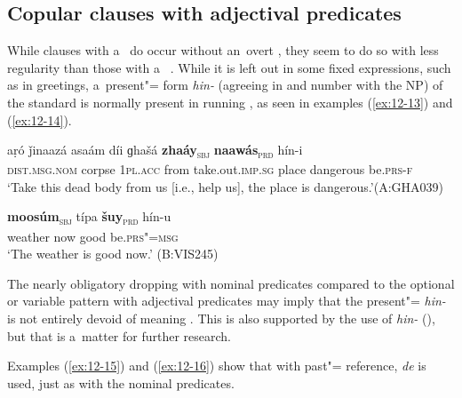 \subsection{Copular clauses with adjectival predicates}
\label{subsec:12-1-2}


While clauses with a~   do occur without an~overt , they seem to do so with less regularity than those with a~  . While it is left out in some fixed expressions, such as in greetings, a~present"= form \textit{hin-} (agreeing in  and number with the NP) of the standard  is normally present in running , as seen in examples (\ref{ex:12-13}) and (\ref{ex:12-14}). 

\ea
\label{ex:12-13}
\gll aṛó ǰinaazá asaám díi ɡhašá {\ob}\textbf{zhaáy}{\cb}\textsubscript{\textsc{\upshape sbj}} {\ob}\textbf{naawás}{\cb}\textsubscript{\textsc{\upshape prd}} hín-i\\
\textsc{dist.msg.nom} corpse \textsc{1pl.acc} from take.out.\textsc{imp.sg}  place dangerous be.\textsc{prs-f} \\
\glt `Take this dead body from us [i.e., help us], the place is dangerous.'\newline (A:GHA039)
\z

\begin{exe}
\ex
\label{ex:12-14}
\gll {\ob}\textbf{moosúm}{\cb}\textsubscript{\textsc{\upshape sbj}} típa {\ob}\textbf{šuy}{\cb}\textsubscript{\textsc{\upshape prd}} hín-u\\
weather now good be.\textsc{prs"=msg}\\
\glt `The weather is good now.' (B:VIS245)
\end{exe}

The nearly obligatory  dropping with nominal predicates compared to the optional or variable pattern with adjectival predicates may imply that the present"=  \textit{hin-} is not entirely devoid of meaning \citep[8, 31, 66]{pustet2003}. This is also supported by the  use of \textit{hin-} (), but that is a~matter for further research.



Examples (\ref{ex:12-15}) and (\ref{ex:12-16}) show that with past"= reference, \textit{de} is used, just as with the nominal predicates.

